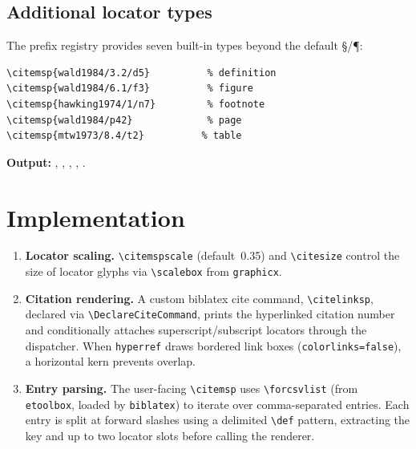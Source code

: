 \documentclass[11pt, a4paper]{article}
\newcommand{\pkg}[1]{\texttt{#1}}
\newcommand{\cmd}[1]{\texttt{\textbackslash #1}}
\begin{document}
\subsection{Additional locator types}

The prefix registry provides seven built-in types beyond the default \S/\P:

\begin{tcolorbox}[colback=blue!3, colframe=blue!30, boxrule=0.5pt, arc=2pt, top=6pt, bottom=6pt, left=10pt, right=10pt]
\begin{verbatim}
\citemsp{wald1984/3.2/d5}          % definition
\citemsp{wald1984/6.1/f3}          % figure
\citemsp{hawking1974/1/n7}         % footnote
\citemsp{wald1984/p42}             % page
\citemsp{mtw1973/8.4/t2}          % table
\end{verbatim}
\end{tcolorbox}

\noindent\textbf{Output:}
,\enspace
{},\enspace
{},\enspace
{},\enspace
{}.


\section{Implementation}


\begin{enumerate}[leftmargin=2em]
  \item \textbf{Locator scaling.} \cmd{citemspscale} (default~0.35) and \cmd{citesize} control the size of locator glyphs via \cmd{scalebox} from \pkg{graphicx}.

  \item \textbf{Citation rendering.} A custom biblatex cite command, \cmd{citelinksp}, declared via \verb|\DeclareCiteCommand|, prints the hyperlinked citation number and conditionally attaches superscript/subscript locators through the dispatcher. When \pkg{hyperref} draws bordered link boxes (\texttt{colorlinks=false}), a horizontal kern prevents overlap.

  \item \textbf{Entry parsing.} The user-facing \cmd{citemsp} uses \verb|\forcsvlist| (from \pkg{etoolbox}, loaded by \pkg{biblatex}) to iterate over comma-separated entries. Each entry is split at forward slashes using a delimited \verb|\def| pattern, extracting the key and up to two locator slots before calling the renderer.
\end{enumerate}
\end{document}
